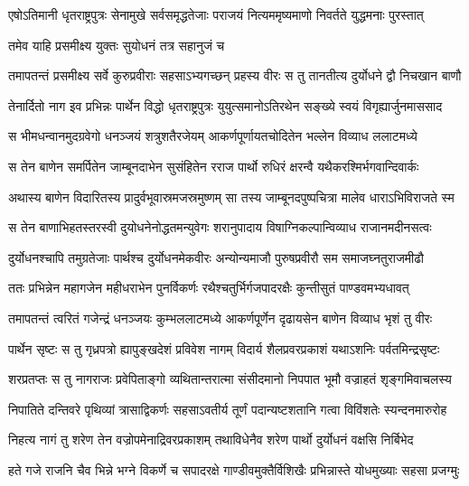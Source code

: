 


\twolineshloka
{एषोऽतिमानी धृतराष्ट्रपुत्रः सेनामुखे सर्वसमृद्धतेजाः}
{पराजयं नित्यममृष्यमाणो निवर्तते युद्धमनाः पुरस्तात्}


\onelineshloka
{तमेव याहि प्रसमीक्ष्य युक्तः सुयोधनं तत्र सहानुजं च}



\twolineshloka
{तमापतन्तं प्रसमीक्ष्य सर्वे कुरुप्रवीराः सहसाऽभ्यगच्छन्}
{प्रहस्य वीरः स तु तानतीत्य दुर्योधने द्वौ निचखान बाणौ}


\twolineshloka
{तेनार्दितो नाग इव प्रभिन्नः पार्थेन विद्धो धृतराष्ट्रपुत्रः}
{युयुत्समानोऽतिरथेन सङ्ख्ये स्वयं विगृह्यार्जुनमाससाद}


\twolineshloka
{स भीमधन्वानमुदग्रवेगो धनञ्जयं शत्रुशतैरजेयम्}
{आकर्णपूर्णायतचोदितेन भल्लेन विव्याध ललाटमध्ये}


\twolineshloka
{स तेन बाणेन समर्पितेन जाम्बूनदाभेन सुसंहितेन}
{रराज पार्थो रुधिरं क्षरन्वै यथैकरश्मिर्भगवान्दिवार्कः}


\twolineshloka
{अथास्य बाणेन विदारितस्य प्रादुर्वभूवास्रमजस्रमुष्णम्}
{सा तस्य जाम्बूनदपुष्पचित्रा मालेव धाराऽभिविराजते स्म}


\twolineshloka
{स तेन बाणाभिहतस्तरस्वी दुयोधनेनोद्धतमन्युवेगः}
{शरानुपादाय विषाग्निकल्पान्विव्याध राजानमदीनसत्वः}


\twolineshloka
{दुर्योधनश्चापि तमुग्रतेजाः पार्थश्च दुर्योधनमेकवीरः}
{अन्योन्यमाजौ पुरुषप्रवीरौ सम समाजघ्नतुराजमीढौ}


\twolineshloka
{ततः प्रभिन्नेन महागजेन महीधराभेन पुनर्विकर्णः}
{रथैश्चतुर्भिर्गजपादरक्षैः कुन्तीसुतं पाण्डवमभ्यधावत्}


\twolineshloka
{तमापतन्तं त्वरितं गजेन्द्रं धनञ्जयः कुम्भललाटमध्ये}
{आकर्णपूर्णेन दृढायसेन बाणेन विव्याध भृशं तु वीरः}


\twolineshloka
{पार्थेन सृष्टः स तु गृध्रपत्रो ह्यापुङ्खदेशं प्रविवेश नागम्}
{विदार्य शैलप्रवरप्रकाशं यथाऽशनिः पर्वतमिन्द्रसृष्टः}


\twolineshloka
{शरप्रतप्तः स तु नागराजः प्रवेपिताङ्गो व्यथितान्तरात्मा}
{संसीदमानो निपपात भूमौ वज्राहतं शृङ्गमिवाचलस्य}


\twolineshloka
{निपातिते दन्तिवरे पृथिव्यां त्रासाद्विकर्णः सहसाऽवतीर्य}
{तूर्णं पदान्यष्टशतानि गत्वा विविंशतेः स्यन्दनमारुरोह}


\twolineshloka
{निहत्य नागं तु शरेण तेन वज्रोपमेनाद्रिवरप्रकाशम्}
{तथाविधेनैव शरेण पार्थो दुर्योधनं वक्षसि निर्बिभेद}


\twolineshloka
{हते गजे राजनि चैव भिन्ने भग्ने विकर्णे च सपादरक्षे}
{गाण्डीवमुक्तैर्विशिखैः प्रभिन्नास्ते योधमुख्याः सहसा प्रजग्मुः}


